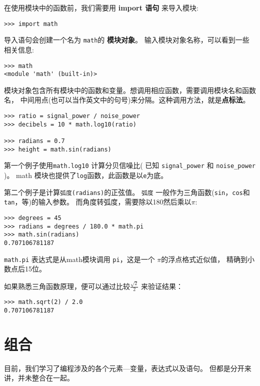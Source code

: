 \documentclass[10pt]{book}
\begin{document}
在使用模块中的函数前，我们需要用 {\bf import 语句} 来导入模块:

\begin{verbatim}
>>> import math
\end{verbatim}
%
导入语句会创建一个名为 {\tt math}的 {\bf 模块对象}。
输入模块对象名称，可以看到一些相关信息:

\begin{verbatim}
>>> math
<module 'math' (built-in)>
\end{verbatim}
%
模块对象包含所有模块中的函数和变量。想调用相应函数，需要调用模块名和函数名，
中间用点(也可以当作英文中的句号)来分隔。这种调用方法，就是{\bf 点标法}。

\begin{verbatim}
>>> ratio = signal_power / noise_power
>>> decibels = 10 * math.log10(ratio)

>>> radians = 0.7
>>> height = math.sin(radians)
\end{verbatim}
%
第一个例子使用\verb"math.log10" 计算分贝信噪比( 已知 \verb"signal_power" 和
\verb"noise_power" )。
math 模块也提供了{\tt log}函数，此函数是以{\tt e}为底。

第二个例子是计算{\tt 弧度(radians)}的正弦值。 
{\tt 弧度} 一般作为三角函数({\tt sin}，{\tt cos}和 {\tt tan}，等)的输入参数。
而角度转弧度，需要除以180然后乘以$\pi$:

\begin{verbatim}
>>> degrees = 45
>>> radians = degrees / 180.0 * math.pi
>>> math.sin(radians)
0.707106781187
\end{verbatim}
%
{\tt math.pi} 表达式是从math模块调用 {\tt pi}，这是一个 $\pi$的浮点格式近似值，
精确到小数点后15位。

如果熟悉三角函数原理，便可以通过比较$\frac{ \sqrt{2}} {2}$ 来验证结果：

\begin{verbatim}
>>> math.sqrt(2) / 2.0
0.707106781187
\end{verbatim}
%

\section{组合}

目前，我们学习了编程涉及的各个元素---变量，表达式以及语句。
但都是分开来讲，并未整合在一起。
\end{document}
